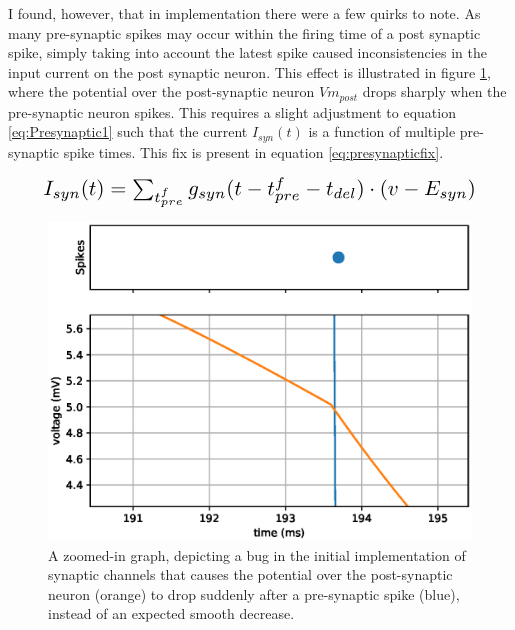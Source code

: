 I found, however, that in implementation there were a few quirks to note. As
many pre-synaptic spikes may occur within the firing time of a post synaptic
spike, simply taking into account the latest spike caused inconsistencies in the
input current on the post synaptic neuron. This effect is illustrated in figure
\ref{fig:LIFDUALBUG}, where the potential over the post-synaptic neuron
$Vm_{post}$ drops sharply when the pre-synaptic neuron spikes. This requires a
slight adjustment to equation \ref{eq:Presynaptic1} such that the current
$I_{syn}(t)$ is a function of multiple pre-synaptic spike times. This fix is
present in equation \ref{eq:presynapticfix}.

\begin{equation}\label{eq:presynapticfix}
    \scalebox{1.5}{$
        I_{syn}(t) = \sum_{t^f_{pre}} g_{syn}(t-t^f_{pre}-t_{del})\cdot(v-E_{syn})
    $}\end{equation}
\vspace{1ex}

\begin{figure}[ht]
    \centering
    \includegraphics[width=0.6\linewidth]{figures/graphs/bugZoomed.eps}
    \caption[Graph of a bug in the initial implementation of synaptic channels]{A zoomed-in graph, depicting a bug in the initial implementation of synaptic channels that causes the potential over the post-synaptic neuron (orange) to drop suddenly after a pre-synaptic spike (blue), instead of an expected smooth decrease.}
    \label{fig:LIFDUALBUG}
\end{figure}




